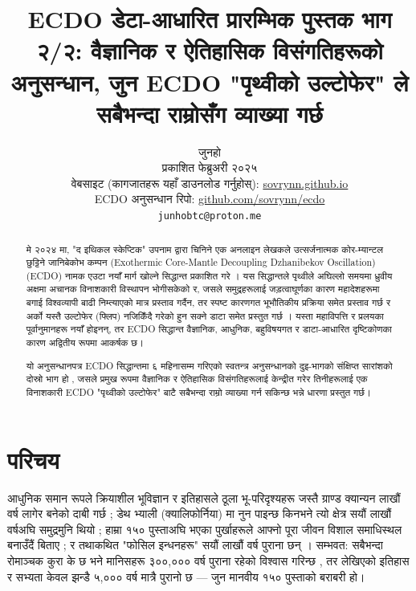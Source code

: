 \documentclass[10pt,twocolumn,letterpaper]{article}
\begin{document}
\title{ECDO डेटा-आधारित प्रारम्भिक पुस्तक भाग २/२: वैज्ञानिक र ऐतिहासिक विसंगतिहरूको अनुसन्धान, जुन ECDO "पृथ्वीको उल्टोफेर" ले सबैभन्दा राम्रोसँग व्याख्या गर्छ}

\author{जुनहो\\
प्रकाशित फेब्रुअरी २०२५\\
वेबसाइट (कागजातहरू यहाँ डाउनलोड गर्नुहोस्): \href{https://sovrynn.github.io}{sovrynn.github.io}\\
ECDO अनुसन्धान रिपो: \href{https://github.com/sovrynn/ecdo}{github.com/sovrynn/ecdo}\\
{\tt\small junhobtc@proton.me}
}

\maketitle

\begin{abstract}
मे २०२४ मा, "द इथिकल स्केप्टिक" उपनाम द्वारा चिनिने एक अनलाइन लेखकले उत्सर्जनात्मक कोर-म्यान्टल छुट्टिने जानिबेकोभ कम्पन (Exothermic Core-Mantle Decoupling Dzhanibekov Oscillation) (ECDO) नामक एउटा नयाँ मार्ग खोल्ने सिद्धान्त प्रकाशित गरे \cite{0}। यस सिद्धान्तले पृथ्वीले अघिल्लो समयमा ध्रुवीय अक्षमा अचानक विनाशकारी विस्थापन भोगीसकेको र, जसले समुद्रहरूलाई जड़त्वाघूर्णका कारण महादेशहरूमा बगाई विश्वव्यापी बाढी निम्त्याएको मात्र प्रस्ताव गर्दैन, तर स्पष्ट कारणगत भूभौतिकीय प्रक्रिया समेत प्रस्ताव गर्छ र अर्को यस्तै उल्टोफेर (फ्लिप) नजिकिँदै गरेको हुन सक्ने डाटा समेत प्रस्तुत गर्छ \cite{1}। यस्ता महाविपत्ति र प्रलयका पूर्वानुमानहरू नयाँ होइनन्, तर ECDO सिद्धान्त वैज्ञानिक, आधुनिक, बहुविषयगत र डाटा-आधारित दृष्टिकोणका कारण अद्वितीय रूपमा आकर्षक छ।

यो अनुसन्धानपत्र ECDO सिद्धान्तमा ६ महिनासम्म गरिएको स्वतन्त्र अनुसन्धानको दुइ-भागको संक्षिप्त सारांशको दोस्रो भाग हो \cite{2,20}, जसले प्रमुख रूपमा वैज्ञानिक र ऐतिहासिक विसंगतिहरूलाई केन्द्रीत गरेर तिनीहरूलाई एक विनाशकारी ECDO "पृथ्वीको उल्टोफेर" बाटै सबैभन्दा राम्रो व्याख्या गर्न सकिन्छ भन्ने धारणा प्रस्तुत गर्छ।

\end{abstract}

\section{परिचय}

आधुनिक समान रूपले क्रियाशील भूविज्ञान र इतिहासले ठूला भू-परिदृश्यहरू जस्तै ग्राण्ड क्यान्यन लाखौं वर्ष लागेर बनेको दाबी गर्छ \cite{143}; डेथ भ्याली (क्यालिफोर्निया) मा नुन पाइन्छ किनभने त्यो क्षेत्र सयौं लाखौं वर्षअघि समुद्रमुनि थियो \cite{144}; हाम्रा १५० पुस्ताअघि भएका पुर्खाहरूले आफ्नो पूरा जीवन विशाल समाधिस्थल बनाउँदैं बिताए \cite{29,70}; र तथाकथित "फोसिल इन्धनहरू" सयौं लाखौं वर्ष पुराना छन् \cite{104}। सम्भवत: सबैभन्दा रोमाञ्चक कुरा के छ भने मानिसहरू ३००,००० वर्ष पुराना रहेको विश्वास गरिन्छ \cite{145}, तर लेखिएको इतिहास र सभ्यता केवल झन्डै ५,००० वर्ष मात्रै पुरानो छ — जुन मानवीय १५० पुस्ताको बराबरी हो।
\end{document}
